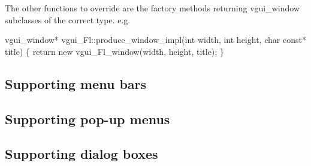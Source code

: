 \documentclass[12pt]{report} \usepackage{epsfig}
\begin{document}
The other functions to override are the factory methods returning vgui\_window subclasses
of the correct type. e.g.

{\scriptsize
\begin{verbawf}
  vgui\_window* vgui\_Fl::produce\_window\_impl(int width, int height, char const* title)
  \{
    return new vgui\_Fl\_window(width, height, title);
  \}
\end{verbawf}
}

\subsection{Supporting menu bars}

\subsection{Supporting pop-up menus}

\subsection{Supporting dialog boxes}
\end{document}
